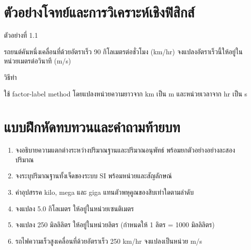\section{ตัวอย่างโจทย์และการวิเคราะห์เชิงฟิสิกส์}

\begin{examplebox}
ตัวอย่างที่ 1.1

รถยนต์คันหนึ่งเคลื่อนที่ด้วยอัตราเร็ว 90 กิโลเมตรต่อชั่วโมง (km/hr) จงแปลงอัตราเร็วนี้ให้อยู่ในหน่วยเมตรต่อวินาที (m/s)

วิธีทำ

ใช้ factor-label method โดยแปลงหน่วยความยาวจาก km เป็น m และหน่วยเวลาจาก hr เป็น s
\end{examplebox}

\section{แบบฝึกหัดทบทวนและคำถามท้ายบท}

\begin{enumerate}
    \item จงอธิบายความแตกต่างระหว่างปริมาณฐานและปริมาณอนุพัทธ์ พร้อมยกตัวอย่างอย่างละสองปริมาณ
    \item จงระบุปริมาณฐานทั้งเจ็ดของระบบ SI พร้อมหน่วยและสัญลักษณ์
    \item คำอุปสรรค kilo, mega และ giga แทนตัวพหุคูณของสิบเท่าใดตามลำดับ
    \item จงแปลง 5.0 กิโลเมตร ให้อยู่ในหน่วยเซนติเมตร
    \item จงแปลง 250 มิลลิลิตร ให้อยู่ในหน่วยลิตร (กำหนดให้ 1 ลิตร = 1000 มิลลิลิตร)
    \item รถไฟความเร็วสูงเคลื่อนที่ด้วยอัตราเร็ว 250 km/hr จงแปลงเป็นหน่วย m/s
\end{enumerate}

